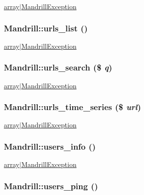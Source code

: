 \label{classMandrill_af70d4c7550167020579323e6162a1085}
\hyperlink{}{array$|$MandrillException }\hypertarget{classMandrill_a8a4335b49cb084ce69edee394e35e8fd}{
\subsubsection[{urls\_\-list}]{\setlength{\rightskip}{0pt plus 5cm}Mandrill::urls\_\-list ()}}
\label{classMandrill_a8a4335b49cb084ce69edee394e35e8fd}
\hyperlink{}{array$|$MandrillException }\hypertarget{classMandrill_a2bb0ebc1c833d77b772cbb125b7c373b}{
\subsubsection[{urls\_\-search}]{\setlength{\rightskip}{0pt plus 5cm}Mandrill::urls\_\-search (\$ {\em q})}}
\label{classMandrill_a2bb0ebc1c833d77b772cbb125b7c373b}
\hyperlink{}{array$|$MandrillException }\hypertarget{classMandrill_ab6bd81f596083cdece40fb197331903c}{
\subsubsection[{urls\_\-time\_\-series}]{\setlength{\rightskip}{0pt plus 5cm}Mandrill::urls\_\-time\_\-series (\$ {\em url})}}
\label{classMandrill_ab6bd81f596083cdece40fb197331903c}
\hyperlink{}{array$|$MandrillException }\hypertarget{classMandrill_aeafe039ea42e06ddf3218b8ae1dcf38b}{
\subsubsection[{users\_\-info}]{\setlength{\rightskip}{0pt plus 5cm}Mandrill::users\_\-info ()}}
\label{classMandrill_aeafe039ea42e06ddf3218b8ae1dcf38b}
\hyperlink{}{array$|$MandrillException }\hypertarget{classMandrill_a589e70d0e68483c711ce6279e124bfc3}{
\subsubsection[{users\_\-ping}]{\setlength{\rightskip}{0pt plus 5cm}Mandrill::users\_\-ping ()}}
